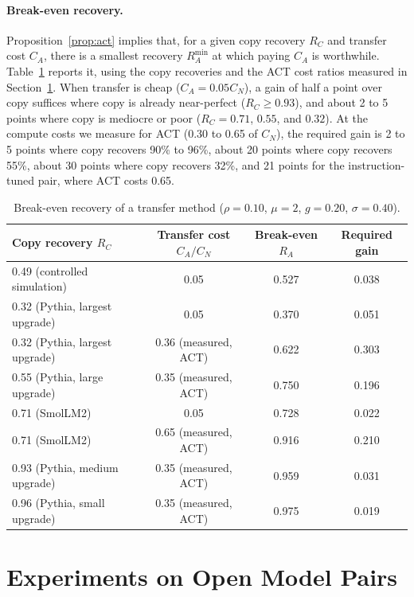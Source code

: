\documentclass[preprint,12pt,authoryear]{elsarticle}
\begin{document}
\paragraph{Break-even recovery.} Proposition~\ref{prop:act} implies that, for a given copy recovery $R_C$ and transfer cost
$C_A$, there is a smallest recovery $R_A^{\min}$ at which paying $C_A$ is worthwhile. Table~\ref{tab:breakeven} reports it, using the copy recoveries and
the ACT cost ratios measured in Section~\ref{sec:pairs}. When transfer is cheap ($C_A=0.05C_N$), a gain of half a point over copy suffices where copy is already
near-perfect ($R_C\ge 0.93$), and about 2 to 5 points where copy is mediocre or poor ($R_C=0.71$, $0.55$, and $0.32$). At the compute costs we measure for ACT (0.30 to 0.65 of $C_N$),
the required gain is 2 to 5 points where copy recovers 90\% to 96\%, about 20 points where copy recovers 55\%, about 30 points where copy recovers 32\%, and 21 points for the instruction-tuned pair, where ACT costs 0.65.

\begin{table}[t]
\centering
\caption{Break-even recovery of a transfer method ($\rho=0.10$, $\mu=2$, $g=0.20$, $\sigma=0.40$).}\label{tab:breakeven}
\begin{tabular}{lccc}
\toprule
Copy recovery $R_C$ & Transfer cost $C_A/C_N$ & Break-even $R_A$ & Required gain\\
\midrule
0.49 (controlled simulation) & 0.05 & 0.527 & 0.038\\
0.32 (Pythia, largest upgrade) & 0.05 & 0.370 & 0.051\\
0.32 (Pythia, largest upgrade) & 0.36 (measured, ACT) & 0.622 & 0.303\\
0.55 (Pythia, large upgrade) & 0.35 (measured, ACT) & 0.750 & 0.196\\
0.71 (SmolLM2) & 0.05 & 0.728 & 0.022\\
0.71 (SmolLM2) & 0.65 (measured, ACT) & 0.916 & 0.210\\
0.93 (Pythia, medium upgrade) & 0.35 (measured, ACT) & 0.959 & 0.031\\
0.96 (Pythia, small upgrade) & 0.35 (measured, ACT) & 0.975 & 0.019\\
\bottomrule
\end{tabular}
\end{table}

\section{Experiments on Open Model Pairs}\label{sec:pairs}
\end{document}
